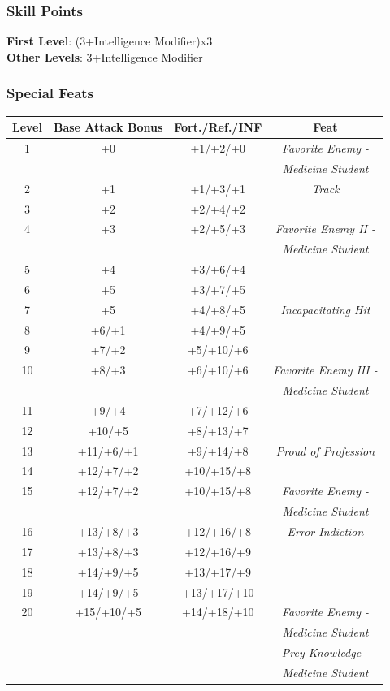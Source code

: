 \documentclass[ letterpaper,12pt]{article}
\begin{document}
\subsubsection{Skill Points}
{\bf First Level}: (3+Intelligence Modifier)x3\\
{\bf Other Levels}: 3+Intelligence Modifier\\

\subsubsection{Special Feats}

\begin{center} \begin{tabular}{|c||c|c|c|}
\hline
{\bf Level}&{\bf Base Attack Bonus}&{\bf Fort./Ref./INF}&{\bf Feat}\\
\hline
1&+0&+1/+2/+0&{\it Favorite Enemy -}\\
&&&{\it Medicine Student}\\
\hline
2&+1&+1/+3/+1&{\it Track}\\
\hline
3&+2&+2/+4/+2&\\
\hline
4&+3&+2/+5/+3&{\it Favorite Enemy II -}\\
&&&{\it Medicine Student}\\
\hline
5&+4&+3/+6/+4&\\
\hline
6&+5&+3/+7/+5&\\
\hline
7&+5&+4/+8/+5&{\it Incapacitating Hit}\\
\hline
8&+6/+1&+4/+9/+5&\\
\hline
9&+7/+2&+5/+10/+6&\\
\hline
10&+8/+3&+6/+10/+6&{\it Favorite Enemy III -}\\
&&&{\it Medicine Student}\\
\hline
11&+9/+4&+7/+12/+6&\\
\hline
12&+10/+5&+8/+13/+7&\\
\hline
13&+11/+6/+1&+9/+14/+8&{\it Proud of Profession}\\
\hline
14&+12/+7/+2&+10/+15/+8&\\
\hline
15&+12/+7/+2&+10/+15/+8&{\it Favorite Enemy -}\\
&&&{\it Medicine Student}\\
\hline
16&+13/+8/+3&+12/+16/+8&{\it Error Indiction}\\
\hline
17&+13/+8/+3&+12/+16/+9&\\
\hline
18&+14/+9/+5&+13/+17/+9&\\
\hline
19&+14/+9/+5&+13/+17/+10&\\
\hline
20&+15/+10/+5&+14/+18/+10&{\it Favorite Enemy -}\\
&&&{\it Medicine Student}\\
&&&{\it Prey Knowledge - }\\
&&&{\it Medicine Student}\\
\hline
\end{tabular} \end{center}
\end{document}
